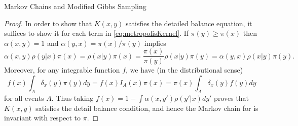 \begin{chapter}{Markov Chains and Modified Gibbs Sampling}
\begin{proof}
In order to show that $K(x,y)$ satisfies the detailed balance equation, it suffices to show it for each term in \eqref{eq:metropolisKernel}.
If $\pi(y) \ge \pi(x)$ then $\alpha(x,y) = 1$ and $\alpha(y,x) = \pi(x)/\pi(y)$ implies 
\begin{equation}
  \alpha(x,y)\rho(y|x)\pi(x) = \rho(x|y)\pi(x) = \frac{\pi(x)}{\pi(y)}\rho(x|y)\pi(y) = \alpha(y,x)\rho(x|y)\pi(y).
\end{equation}
Moreover, for any integrable function $f$, we have (in the distributional sense)
\begin{equation}
  f(x)\int_A \delta_x(y) \pi(y)dy = f(x)I_A(x)\pi(x) = \pi(x)\int_A \delta_x(y) f(y)dy
\end{equation}
for all events $A$. 
Thus taking $f(x) = 1 - \int\alpha(x,y')\rho(y'|x)dy'$ proves that $K(x,y)$ satisfies the detail balance condition, and hence the Markov chain for  is invariant with respect to $\pi$.
\end{proof}


\end{chapter}
